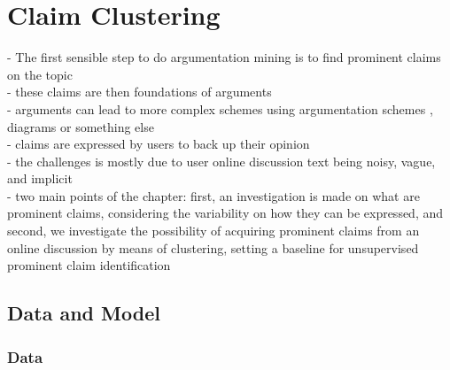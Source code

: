 \chapter{Claim Clustering}
\label{chap:argclu}

- The first sensible step to do argumentation mining is to find 
prominent claims on the topic \\
- these claims are then foundations of arguments \\
- arguments can lead to more complex schemes using argumentation schemes
\citep{walton2008argumentation}, diagrams
or something else \\
- claims are expressed by users to back up their opinion \\

- the challenges is mostly due to user online discussion text being noisy,
vague, and implicit \\
- two main points of the chapter: first, an investigation is made on what are
prominent claims, considering the variability on how they can be expressed, and
second, we investigate the possibility of acquiring prominent claims from an
online discussion by means of clustering, setting a baseline for unsupervised
prominent claim identification \\

\section{Data and Model}

\subsection{Data}

